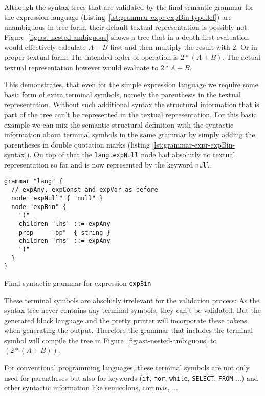 \documentclass[sigconf,natbib=false]{acmart}
\begin{document}
Although the syntax trees that are validated by the final semantic grammar for the expression language (Listing~\ref{lst:grammar-expr-expBin-typedef}) are unambiguous in tree form, their default textual representation is possibly not. Figure~\ref{fig:ast-nested-ambiguous} shows a tree that in a depth first evaluation would effectively calculate $A+B$ first and then multiply the result with $2$. Or in proper textual form: The intended order of operation is $2 * (A+B)$. The actual textual representation however would evaluate to $2 * A + B$.

This demonstrates, that even for the simple expression language we require some basic form of extra terminal symbols, namely the parenthesis in the textual representation. Without such additional syntax the structural information that is part of the tree can't be represented in the textual representation. For this basic example we can mix the semantic structural definition with the syntactic information about terminal symbols in the same grammar by simply adding the parentheses in double quotation marks (listing \ref{lst:grammar-expr-expBin-syntax}). On top of that the \texttt{lang.expNull} node had absolutly no textual representation so far and is now represented by the keyword \texttt{null}.

\begin{listing}[H]
\begin{verbatim}
grammar "lang" {
  // expAny, expConst and expVar as before
  node "expNull" { "null" }
  node "expBin" {
    "("
    children "lhs" ::= expAny
    prop     "op"  { string }
    children "rhs" ::= expAny
    ")"
  }
}
\end{verbatim}
\caption{Final syntactic grammar for expression \texttt{expBin}}
\label{lst:grammar-expr-expBin-syntax}
\end{listing}

These terminal symbols are absolutly irrelevant for the validation process: As the syntax tree never contains any terminal symbols, they can't be validated. But the generated block language and the pretty printer will incorporate these tokens when generating the output. Therefore the grammar that includes the terminal symbol will compile the tree in Figure~\ref{fig:ast-nested-ambiguous} to $(2 * (A + B))$.

For conventional programming languages, these terminal symbols are not only used for parentheses but also for keywords (\texttt{if}, \texttt{for}, \texttt{while}, \texttt{SELECT}, \texttt{FROM} ...) and other syntactic information like semicolons, commas, ...
\end{document}
